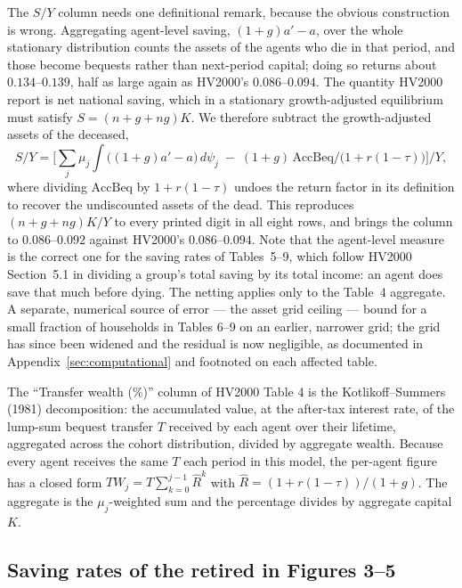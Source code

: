 \documentclass[11pt,fleqn]{article}
\begin{document}
The $S/Y$ column needs one definitional remark, because the obvious construction is wrong. Aggregating agent-level saving, $(1+g)a' - a$, over the whole stationary distribution counts the assets of the agents who die in that period, and those become bequests rather than next-period capital; doing so returns about $0.134$--$0.139$, half as large again as HV2000's $0.086$--$0.094$. The quantity HV2000 report is net national saving, which in a stationary growth-adjusted equilibrium must satisfy $S = (n+g+ng)K$. We therefore subtract the growth-adjusted assets of the deceased,
\begin{equation*}
 S/Y = \Big[\textstyle\sum_j \mu_j \int \big((1+g)a' - a\big)\,d\psi_j \;-\; (1+g)\,\text{AccBeq}\big/\big(1+r(1-\tau)\big)\Big] \Big/ Y,
\end{equation*}
where dividing $\text{AccBeq}$ by $1+r(1-\tau)$ undoes the return factor in its definition to recover the undiscounted assets of the dead. This reproduces $(n+g+ng)K/Y$ to every printed digit in all eight rows, and brings the column to $0.086$--$0.092$ against HV2000's $0.086$--$0.094$. Note that the agent-level measure is the correct one for the saving rates of Tables~5--9, which follow HV2000 Section~5.1 in dividing a group's total saving by its total income: an agent does save that much before dying. The netting applies only to the Table~4 aggregate. A separate, numerical source of error --- the asset grid ceiling --- bound for a small fraction of households in Tables 6--9 on an earlier, narrower grid; the grid has since been widened and the residual is now negligible, as documented in Appendix~\ref{sec:computational} and footnoted on each affected table.

The ``Transfer wealth (\%)'' column of HV2000 Table 4 is the Kotlikoff--Summers (1981) decomposition: the accumulated value, at the after-tax interest rate, of the lump-sum bequest transfer $T$ received by each agent over their lifetime, aggregated across the cohort distribution, divided by aggregate wealth. Because every agent receives the same $T$ each period in this model, the per-agent figure has a closed form $TW_j = T \sum_{k=0}^{j-1} \hat R^{k}$ with $\hat R = (1 + r(1-\tau)) / (1+g)$. The aggregate is the $\mu_j$-weighted sum and the percentage divides by aggregate capital $K$.

\subsection*{Saving rates of the retired in Figures 3--5}
\end{document}
